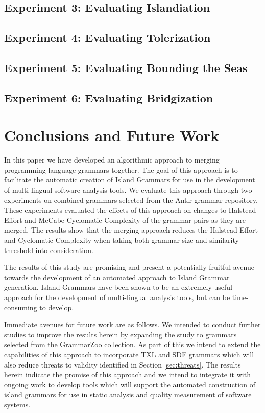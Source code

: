 \documentclass[10pt,nocc]{xrese_report}
\begin{document}
\section{Experiment 3: Evaluating Islandiation}

\section{Experiment 4: Evaluating Tolerization}

\section{Experiment 5: Evaluating Bounding the Seas}

\section{Experiment 6: Evaluating Bridgization}

\chapter{Conclusions and Future Work}

In this paper we have developed an algorithmic approach to merging programming language grammars together. The goal of this approach is to facilitate the automatic creation of Island Grammars for use in the development of multi-lingual software analysis tools. We evaluate this approach through two experiments on combined grammars selected from the Antlr grammar repository. These experiments evaluated the effects of this approach on changes to Halstead Effort and McCabe Cyclomatic Complexity of the grammar pairs as they are merged. The results show that the merging approach reduces the Halstead Effort and Cyclomatic Complexity when taking both grammar size and similarity threshold into consideration.

The results of this study are promising and present a potentially fruitful avenue towards the development of an automated approach to Island Grammar generation. Island Grammars have been shown to be an extremely useful approach for the development of multi-lingual analysis tools, but can be time-consuming to develop.

Immediate avenues for future work are as follows. We intended to conduct further studies to improve the results herein by expanding the study to grammars selected from the GrammarZoo \cite{zaytsev_grammar_2015} collection. As part of this we intend to extend the capabilities of this approach to incorporate TXL and SDF grammars which will also reduce threats to validity identified in Section \ref{sec:threats}. The results herein indicate the promise of this approach and we intend to integrate it with ongoing work to develop tools which will support the automated construction of island grammars for use in static analysis and quality measurement of software systems.



\end{document}
